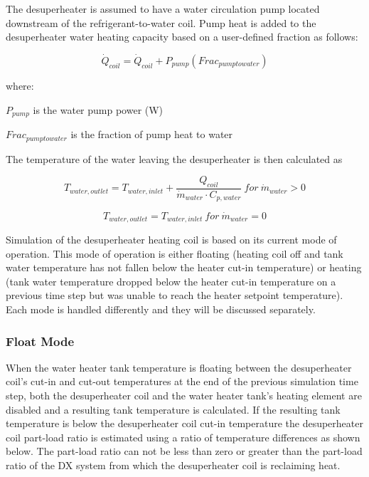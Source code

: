 The desuperheater is assumed to have a water circulation pump located downstream of the refrigerant-to-water coil. Pump heat is added to the desuperheater water heating capacity based on a user-defined fraction as follows:

\begin{equation}
{\dot Q_{coil}} = {\dot Q_{coil}} + {P_{pump}}\left( {Fra{c_{pumptowater}}} \right)
\end{equation}

where:

\({P_{pump}}\) is the water pump power (W)

\(Fra{c_{pumptowater}}\) is the fraction of pump heat to water

The temperature of the water leaving the desuperheater is then calculated as

\begin{equation}
{T_{water,outlet}} = {T_{water,inlet}} + \frac{{{Q_{coil}}}}{{{{\dot m}_{water}}\cdot {C_{p,water}}}} ~for~ {\dot m_{water}} > 0
\end{equation}

\begin{equation}
{T_{water,outlet}} = {T_{water,inlet}} ~for~ {\dot m_{water}} = 0
\end{equation}

Simulation of the desuperheater heating coil is based on its current mode of operation. This mode of operation is either floating (heating coil off and tank water temperature has not fallen below the heater cut-in temperature) or heating (tank water temperature dropped below the heater cut-in temperature on a previous time step but was unable to reach the heater setpoint temperature). Each mode is handled differently and they will be discussed separately.

\subsubsection{Float Mode}\label{float-mode}

When the water heater tank temperature is floating between the desuperheater coil's cut-in and cut-out temperatures at the end of the previous simulation time step, both the desuperheater coil and the water heater tank's heating element are disabled and a resulting tank temperature is calculated. If the resulting tank temperature is below the desuperheater coil cut-in temperature the desuperheater coil part-load ratio is estimated using a ratio of temperature differences as shown below. The part-load ratio can not be less than zero or greater than the part-load ratio of the DX system from which the desuperheater coil is reclaiming heat.

